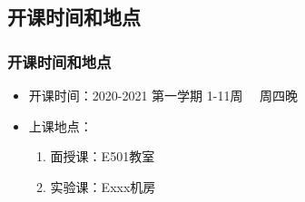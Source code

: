 \documentclass[11pt]{beamer}
\begin{document}
	\subsection{开课时间和地点}
	\begin{frame}
	\frametitle{开课时间和地点}
	\begin{itemize}
		\item 开课时间：2020-2021 第一学期 1-11周 \ \ 周四晚
		\item 上课地点：
		\begin{enumerate}
			\item 面授课：E501教室
			\item 实验课：Exxx机房
		\end{enumerate}
	\end{itemize}
\end{frame}
\end{document}
